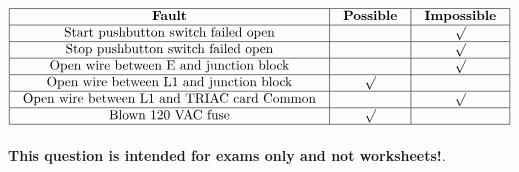 






$$\vbox{\offinterlineskip
\halign{\strut
\vrule \quad\hfil # \ \hfil & 
\vrule \quad\hfil # \ \hfil & 
\vrule \quad\hfil # \ \hfil \vrule \cr
\noalign{\hrule}
%
{\bf Fault} & {\bf Possible} & {\bf Impossible} \cr
%
\noalign{\hrule}
%
Start pushbutton switch failed open &  & $\surd$ \cr
%
\noalign{\hrule}
%
Stop pushbutton switch failed open &  & $\surd$ \cr
%
\noalign{\hrule}
%
Open wire between E and junction block &  & $\surd$ \cr
%
\noalign{\hrule}
%
Open wire between L1 and junction block & $\surd$ &  \cr
%
\noalign{\hrule}
%
Open wire between L1 and TRIAC card Common &  & $\surd$ \cr
%
\noalign{\hrule}
%
Blown 120 VAC fuse & $\surd$ &  \cr
%
\noalign{\hrule}
} %
}$$ %







{\bf This question is intended for exams only and not worksheets!}.


